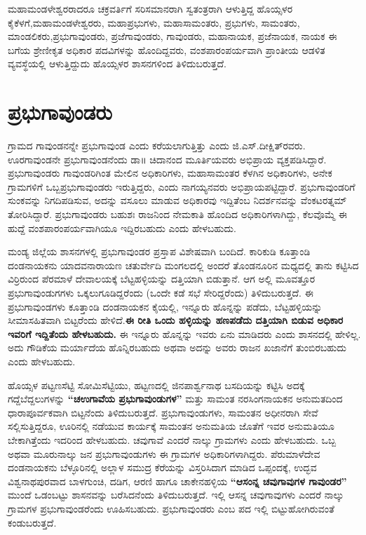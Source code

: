 ಮಹಾಮಂಡಳೇಶ್ವರರಾದರೂ ಚಕ್ರವರ್ತಿಗೆ ಸರಿಸಮಾನರಾಗಿ ಸ್ವತಂತ್ರರಾಗಿ ಆಳುತ್ತಿದ್ದ ಹೊಯ್ಸಳರ ಕೈಕೆಳಗೆ,\break ಮಹಾಮಂಡಳೇಶ್ವರರು, ಮಹಾಪ್ರಭುಗಳು, ಮಹಾಸಾಮಂತರು, ಪ್ರಭುಗಳು, ಸಾಮಂತರು, ಮಾಂಡಲಿಕರು,\break ಪ್ರಭುಗಾವುಂಡರು, ಪ್ರಜೆಗಾವುಂಡರು, ಗಾವುಂಡರು, ಮಹಾನಾಯಕ, ಪ್ರಜೆನಾಯಕ, ನಾಯಕ ಈ ಬಗೆಯ ಶ್ರೇಣೀಕೃತ ಅಧಿಕಾರ ಪದವಿಗಳನ್ನು ಹೊಂದಿದ್ದವರು, ವಂಶಪಾರಂಪರ್ಯವಾಗಿ ಪ್ರಾಂತೀಯ ಆಡಳಿತ ವ್ಯವಸ್ಥೆಯಲ್ಲಿ ಆಳುತ್ತಿದ್ದುದು ಹೊಯ್ಸಳರ ಶಾಸನಗಳಿಂದ ತಿಳಿದುಬರುತ್ತದೆ.


\section{ಪ್ರಭುಗಾವುಂಡರು}

ಗ್ರಾಮದ ಗಾವುಂಡನನ್ನೇ ಪ್ರಭುಗಾವುಂಡ ಎಂದು ಕರೆಯಲಾಗುತ್ತಿತ್ತು ಎಂದು ಜಿ.ಎಸ್​.ದೀಕ್ಷಿತ್​ರವರು. ಊರಗಾವುಂಡನೇ ಪ್ರಭುಗಾವುಂಡನೆಂದು ಡಾ॥ ಚಿದಾನಂದ ಮೂರ್ತಿಯವರು ಅಭಿಪ್ರಾಯ ವ್ಯಕ್ತಪಡಿಸಿದ್ದಾರೆ. ಪ್ರಭುಗಾವುಂಡರು ಗಾವುಂಡರಿಗಿಂತ ಮೇಲಿನ ಅಧಿಕಾರಿಗಳು, ಮಹಾಸಾಮಂತರ ಕೆಳಗಿನ ಅಧಿಕಾರಿಗಳು, ಅನೇಕ ಗ್ರಾಮಗಳಿಗೆ ಒಬ್ಬ\break ಪ್ರಭುಗಾವುಂಡರು ಇರುತ್ತಿದ್ದರು, ಎಂದು ನಾಗಯ್ಯನವರು ಅಭಿಪ್ರಾಯಪಟ್ಟಿದ್ದಾರೆ. ಪ್ರಭುಗಾವುಂಡರಿಗೆ ಸುಂಕವನ್ನು ನಿಗದಿಪಡಿಸುವ, ಅದನ್ನು ವಸೂಲು ಮಾಡುವ ಅಧಿಕಾರವು ಇದ್ದಿತೆಂಬ ನಿದರ್ಶನವನ್ನು ವೆಂಕಟರತ್ನಮ್ ತೋರಿಸಿದ್ದಾರೆ. ಪ್ರಭುಗಾವುಂಡರು ಬಹುಶಃ ರಾಜನಿಂದ ನೇಮಕಾತಿ ಹೊಂದಿದ ಅಧಿಕಾರಿಗಳಾಗಿದ್ದು, ಕೆಲವೊಮ್ಮೆ ಈ ಹುದ್ದೆ ವಂಶಪಾರಂಪರ್ಯ\-ವಾಗಿಯೂ ಇದ್ದಿರಬಹುದು ಎಂದು ಹೇಳಬಹುದು.

ಮಂಡ್ಯ ಜಿಲ್ಲೆಯ ಶಾಸನಗಳಲ್ಲಿ ಪ್ರಭುಗಾವುಂಡರ ಪ್ರಸ್ತಾಪ ವಿಶೇಷವಾಗಿ ಬಂದಿದೆ. ಕಾರಿಕುಡಿ ಕೂತ್ತಾಂಡಿ ದಂಡನಾಯಕನು ಯಾದವನಾರಾಯಣ ಚತುರ್ವೇದಿ ಮಂಗಲದಲ್ಲಿ ಅಂದರೆ ತೊಂಡನೂರಿನ ಮಧ್ಯದಲ್ಲಿ ತಾನು ಕಟ್ಟಿಸಿದ ವಿರ್ರಿರುಂದ ಪೆರಮಾಳೆ ದೇವಾಲಯಕ್ಕೆ ಬೆಟ್ಟಹಳ್ಳಿಯನ್ನು ದತ್ತಿಯಾಗಿ ಬಿಡುತ್ತಾನೆ. ಆಗ ಅಲ್ಲಿ ಮೂವತ್ತೂರ ಪ್ರಭುಗಾವುಂಡುಗಗಳು ಒಕ್ಕಲುಗೂಡಿದ್ದರೆಂದು (ಒಂದೇ ಕಡೆ ಸಭೆ ಸೇರಿದ್ದರೆಂದು) ತಿಳಿದುಬರುತ್ತದೆ. ಈ ಪ್ರಭುಗಾವುಂಡಗಳು ಕೂತ್ತಾಂಡಿ ದಂಡನಾಯಕನ ಕೈಯಲ್ಲಿ, ಇನ್ನೂರು ಹೊನ್ನನ್ನು ಪಡೆದು, ಬೆಟ್ಟಹಳ್ಳಿಯನ್ನು ಸೀಮಾಸಹಿತವಾಗಿ ಬಿಟ್ಟರೆಂದು ಹೇಳಿದೆ.\textbf{ಈ ರೀತಿ ಒಂದು ಹಳ್ಳಿಯನ್ನು ಹಣಪಡೆದು ದತ್ತಿಯಾಗಿ ಬಿಡುವ ಅಧಿಕಾರ ಇವರಿಗೆ ಇದ್ದಿತೆಂದು ಹೇಳಬಹುದು.} ಈ ಇನ್ನೂರು ಹೊನ್ನನ್ನು ಇವರು ಏನು ಮಾಡಿದರು ಎಂದು ಶಾಸನದಲ್ಲಿ ಹೇಳಿಲ್ಲ. ಅದು ಗೌಡಿಕೆಯ ಮರ್ಯಾದೆಯ ಹೊನ್ನಿರಬಹುದು ಅಥವಾ ಅದನ್ನು ಅವರು ರಾಜನ ಖಜಾನೆಗೆ ತುಂಬಿರಬಹುದು ಎಂದು ಹೇಳಬಹುದು.

ಹೊಯ್ಸಳ ಪಟ್ಟಣಸೆಟ್ಟಿ ಸೋಮಿಸೆಟ್ಟಿಯು, ಹಟ್ಟಣದಲ್ಲಿ ಜಿನಪಾರ್ಶ್ವನಾಥ ಬಸದಿಯನ್ನು ಕಟ್ಟಿಸಿ ಅದಕ್ಕೆ ಗದ್ದೆಬೆದ್ದಲು\-ಗಳನ್ನು \textbf{“ಚಉಗಾವೆಯ ಪ್ರಭುಗಾವುಂಡುಗಳ”} ಮತ್ತು ಸಾಮಂತ ನರಸಿಂಗನಾಯಕನ ಅನುಮತದಿಂದ ಧಾರಾಪೂರ್ವಕವಾಗಿ ಬಿಟ್ಟನೆಂದು ತಿಳಿದುಬರುತ್ತದೆ. ಪ್ರಭುಗಾವುಂಡುಗಳು, ಸಾಮಂತನ ಅಧೀನರಾಗಿ ಸೇವೆ ಸಲ್ಲಿಸುತ್ತಿದ್ದರೂ, ಊರಿನಲ್ಲಿ ನಡೆಯುವ ಕಾರ್ಯಕ್ಕೆ ಸಾಮಂತನ ಅನುಮತಿಯ ಜೊತೆಗೆ ಇವರ ಅನುಮತಿಯೂ ಬೇಕಾಗಿತ್ತೆಂದು ಇದರಿಂದ ಹೇಳಬಹುದು. ಚವುಗಾವೆ ಎಂದರೆ ನಾಲ್ಕು ಗ್ರಾಮಗಳು ಎಂದು ಹೇಳಬಹುದು. ಒಬ್ಬ ಅಥವಾ ಮೂರುನಾಲ್ಕು ಜನ ಪ್ರಭುಗಾವುಂಡುಗಳು ಈ ಗ್ರಾಮಗಳ ಅಧಿಕಾರಿಗಳಾಗಿದ್ದರು. ಪೆರುಮಾಳೆದೇವ ದಂಡನಾಯಕನು ಬೆಳ್ಳೂರಿನಲ್ಲಿ ಅಲ್ಲಾಳ ಸಮುದ್ರ ಕೆರೆಯನ್ನು ವಿಸ್ತರಿಸಿದಾಗ ಮಾಡಿದ ಒಪ್ಪಂದಕ್ಕೆ, ಉದ್ಭವ ವಿಶ್ವನಾಥಪುರವಾದ ಬಾಳಗುಂಚಿ, ದಡಿಗ, ಆರಣಿ ಹಾಗೂ ಚಾಕೇನಹಳ್ಳಿಯ \textbf{“ಆಸಂನ್ನ ಚವುಗಾವುಗಳ ಗಾವುಂಡರ” }ಮುಂದೆ ಒಡಂಬಟ್ಟು ಶಾಸನವನ್ನು ಬರೆಸಿದನೆಂದು ತಿಳಿದುಬರುತ್ತದೆ. ಇಲ್ಲಿ ಆಸನ್ನ ಚವುಗಾವುಗಳು ಎಂದರೆ ನಾಲ್ಕು ಗ್ರಾಮಗಳ ಪ್ರಭುಗಾವುಂಡರೆಂದು ಊಹಿಸಬಹುದು. ಪ್ರಭುಗಾವುಂಡರು ಎಂಬ ಪದ ಇಲ್ಲಿ ಬಿಟ್ಟುಹೋಗಿರುವಂತೆ ಕಂಡುಬರುತ್ತದೆ.

